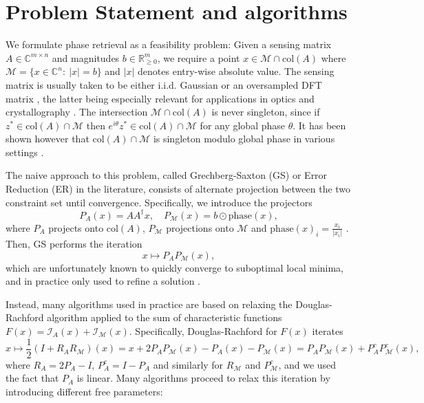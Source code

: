 \documentclass[journal]{IEEEtran}
\theoremstyle{definition}
\theoremstyle{remark}
\theoremstyle{definition}
\theoremstyle{problem}
\theoremstyle{definition}
\newcommand{\col}{\text{col}}
\newcommand{\phase}{\text{phase}}
\newcommand{\RR}{\mathbb{R} }
\newcommand{\II}{\mathcal{I} }
\newcommand{\CC}{\mathbb{C}}
\newcommand{\MM}{\mathcal{M}}
\newcommand{\TODO}[1]{{\color{red}{[#1]}}}
\begin{document}
\section{Problem Statement and algorithms}

We formulate phase retrieval as a feasibility problem: Given a sensing matrix $A\in\CC^{m\times n}$ and magnitudes $b\in\RR^{m}_{\geq 0}$, we require a point $x\in\MM\cap \col(A)$ where $\MM=\{x\in\CC^n:\ |x|=b\}$ and $|x|$ denotes entry-wise absolute value. The sensing matrix is usually taken to be either i.i.d. Gaussian or an oversampled DFT matrix \cite{Bendory2017}, the latter being especially relevant for applications in optics and crystallography \cite{Elser2017, Luke2005}. The intersection $\MM\cap\col(A)$ is never singleton, since if $z^*\in\col(A)\cap\MM$ then $e^{i\theta}z^*\in\col(A)\cap \MM$ for any global phase $\theta$. It has been shown however that $\col(A)\cap\MM$ is singleton modulo global phase in various settings \cite{Bandeira2014,Bendory2017,Conca2015}. \TODO{Expand on this?}

\TODO{After presenting the problem, I think this section should include three sub-section, one for each approach: optimization (minimizing an objective), alternating projection, and the Douglas-Rachford. The latter should introduce DR in its generality (some details may be located in an appendix) and then particularize it to PR. We also need to say what it known theoretically about DR and relate it to ADMM.}

The naive approach to this problem, called Grechberg-Saxton (GS) or Error Reduction (ER) in the literature, consists of alternate projection between the two constraint set until convergence. Specifically, we introduce the projectors 
\begin{equation}\label{eq:projections}
    P_A(x) = AA^{\dagger}x, \quad P_{\MM}(x)=b\odot \phase(x),
\end{equation}
where $P_A$ projects onto $\col(A)$, $P_{\MM}$ projections onto $\MM$ and $\phase(x)_i=\frac{x_i}{|x_i|}$ \TODO{Notation should be explained...}. Then, GS performs the iteration 
\begin{equation}\label{eq:GS}
    x\mapsto P_AP_{\MM}(x),    
\end{equation}
which are unfortunately known to quickly converge to suboptimal local minima, and in practice only used to refine a solution \cite{Elser2017, Marchesini2007}. 

Instead, many algorithms used in practice are based on relaxing the Douglas-Rachford algorithm applied to the sum of characteristic functions $F(x) = \II_{A}(x)+\II_{\MM}(x)$. Specifically, Douglas-Rachford for $F(x)$ iterates \begin{equation}\label{eq:Doug_Rach}
    x\mapsto \frac{1}{2}(I+R_AR_{\MM})(x) = x + 2P_AP_{\MM}(x) - P_A(x) - P_{\MM}(x) = P_AP_{\MM}(x) + P_A^cP_{\MM}^c(x),
\end{equation} 
where $R_A = 2P_A-I$, $P_A^c=I-P_A$ and similarly for $R_{\MM}$ and $P_{\MM}^c$, and we used the fact that $P_A$ is linear. Many algorithms proceed to relax this iteration by introducing different free parameters\TODO{Rewrite in terms of reflections?}:
\end{document}
